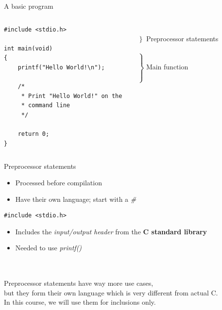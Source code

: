 \begin{frame}[fragile]{A basic program}
	\begin{columns}[T]
		\begin{lstlisting}
#include <stdio.h>

int main(void)
{
	printf("Hello World!\n");
	
	/*
	 * Print "Hello World!" on the
	 * command line
	 */

	return 0;
}
\end{lstlisting}
		
		\ \\$\left. \begin{array}{c}\\\end{array}\right\rbrace $ Preprocessor statements
		\ \\\ \\$\left. \begin{array}{c}\\\\\\\\\\\\\\\\\\\end{array}\right\rbrace $ Main function
	\end{columns}
\end{frame}
\begin{frame}[fragile]{Preprocessor statements}
	\begin{itemize}
		\item Processed before compilation
		\item Have their own language; start with a \textit{\#}
	\end{itemize}
	\begin{lstlisting}
#include <stdio.h>
\end{lstlisting}
	\begin{itemize}
		\item Includes the \textit{input/output header} from the \textbf{C standard library}
		\item Needed to use \textit{printf()}
	\end{itemize}\ \\ \ \\
	Preprocessor statements have way more use cases,\\
	but they form their own language which is very different from actual C.\\
	\bigskip
	In this course, we will use them for inclusions only.
\end{frame}
